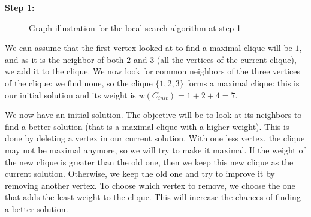 \begin{minipage}{\linewidth}
    \textbf{Step 1:} \newline
    
    \begin{minipage}{0.4\textwidth}
        \begin{figure}[H]
            \centering
            \caption{Graph illustration for the local search algorithm at step 1}
            \label{fig:local-search-mewc-init-1}
        \end{figure}
    \end{minipage}
    \begin{minipage}{0.6\textwidth}
        We can assume that the first vertex looked at to find a maximal clique will 
        be $1$, and as it is the neighbor of both $2$ and $3$ (all the vertices of 
        the current clique), we add it to the clique. We now look for common 
        neighbors of the three vertices of the clique: we find none, so the 
        clique $\{1, 2, 3\}$ forms a maximal clique: this is our initial solution 
        and its weight is $w(C_{init}) = 1+2+4 = 7$.
    \end{minipage}
\end{minipage}

\bigskip

We now have an initial solution. The objective will be to look at its neighbors to 
find a better solution (that is a maximal clique with a higher weight). This is done 
by deleting a vertex in our current solution. With one less vertex, the clique may 
not be maximal anymore, so we will try to make it maximal. If the weight of the new 
clique is greater than the old one, then we keep this new clique as the current 
solution. Otherwise, we keep the old one and try to improve it by removing another 
vertex. To choose which vertex to remove, we choose the one that adds the least 
weight to the clique. This will increase the chances of finding a better solution.

